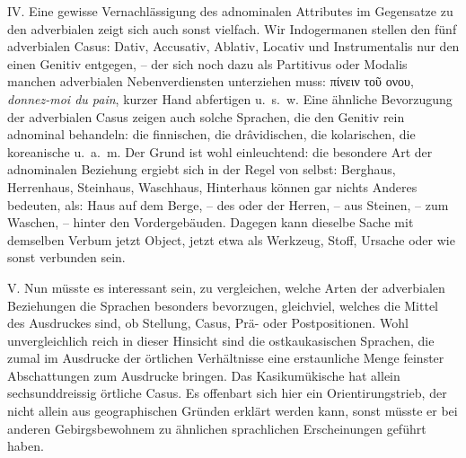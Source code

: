 \largerpage
IV. Eine gewisse Vernachlässigung des adnominalen Attributes im Gegensatze zu den adverbialen zeigt sich auch sonst vielfach. Wir Indogermanen stellen den fünf adverbialen Casus: Dativ, Accusativ, Ablativ, Locativ und Instrumentalis nur den einen Genitiv entgegen, – der sich noch dazu als Partitivus oder Modalis manchen adverbialen Nebenverdiensten unterziehen muss: πίνειν τοῦ ονου, \textit{donnez-moi du pain}, kurzer Hand abfertigen u.~s.~w. Eine ähnliche Bevorzugung der adverbialen Casus zeigen auch solche Sprachen, die den Genitiv rein adnominal behandeln: die finnischen, die drâvidischen, die kolarischen, die koreanische u.~a.~m. Der Grund ist wohl einleuchtend: die besondere Art der adnominalen Beziehung ergiebt sich in der Regel von selbst: Berghaus, Herrenhaus, Steinhaus, Waschhaus, Hinterhaus können gar nichts Anderes bedeuten, als: Haus auf dem Berge, – des oder der Herren, – aus Steinen, – zum Waschen, – hinter den Vordergebäuden. Dagegen kann dieselbe Sache mit demselben Verbum jetzt  Object, jetzt etwa als Werkzeug, Stoff, Ursache oder wie sonst verbunden sein.

V. Nun müsste es interessant sein, zu vergleichen, welche Arten der adverbialen Beziehungen die Sprachen besonders bevorzugen, gleichviel, welches die Mittel des Ausdruckes sind, ob Stellung, Casus, Prä- oder Postpositionen. Wohl unvergleichlich reich in dieser Hinsicht sind die ostkaukasischen Sprachen, die zumal im Ausdrucke der örtlichen Verhältnisse eine erstaunliche Menge feinster Abschattungen zum Ausdrucke bringen. Das Kasikumükische hat allein sechsunddreissig örtliche Casus. Es offenbart sich hier ein Orientirungstrieb, \label{sp.463} der nicht allein aus geographischen Gründen erklärt werden kann, sonst müsste er bei anderen Gebirgsbewohnem zu ähnlichen sprachlichen Erscheinungen geführt haben.

